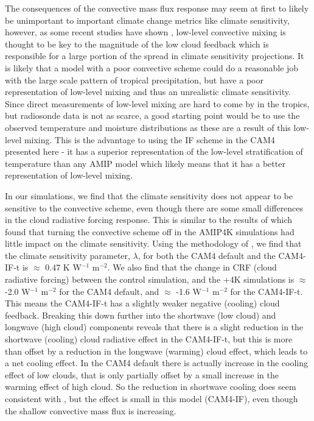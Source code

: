 \documentclass[letterpaper,12pt,titlepage,oneside,final]{book}
\begin{document}
The consequences of the convective mass flux response may seem at first to likely be unimportant to important climate change metrics like climate sensitivity, however, as some recent studies have shown \citep{sherwood_spread_2014,brient_shallowness_2016}, low-level convective mixing is thought to be key to the magnitude of the low cloud feedback which is responsible for a large portion of the spread in climate sensitivity projections. It is likely that a model with a poor convective scheme could do a reasonable job with the large scale pattern of tropical precipitation, but have a poor representation of low-level mixing and thus an unrealistic climate sensitivity. Since direct measurements of low-level mixing are hard to come by in the tropics, but radiosonde data is not as scarce, a good starting point would be to use the observed temperature and moisture distributions as these are a result of this low-level mixing. This is the advantage to using the IF scheme in the CAM4 presented here - it has a superior representation of the low-level stratification of temperature than any AMIP model which likely means that it has a better representation of low-level mixing.

In our simulations, we find that the climate sensitivity does not appear to be sensitive to the convective scheme, even though there are some small differences in the cloud radiative forcing response. This is similar to the results of \citep{webb_impact_2015} which found that turning the convective scheme off in the AMIP4K simulations had little impact on the climate sensitivity. Using the methodology of \citep{cess_intercomparison_1990}, we find that the climate sensitivity parameter, $\lambda$, for both the CAM4 default and the CAM4-IF-t is $\approx$ 0.47 K W$^{-1}$ m$^{-2}$. We also find that the change in CRF (cloud radiative forcing) between the control simulation, and the +4K simulations is $\approx$ -2.0 W$^{-1}$ m$^{-2}$ for the CAM4 default, and $\approx$ -1.6 W$^{-1}$ m$^{-2}$ for the CAM4-IF-t. This means the CAM4-IF-t has a slightly weaker negative (cooling) cloud feedback. Breaking this down further into the shortwave (low cloud) and longwave (high cloud) components reveals that there is a slight reduction in the shortwave (cooling) cloud radiative effect in the CAM4-IF-t, but this is more than offset by a reduction in the longwave (warming) cloud effect, which leads to a net cooling effect. In the CAM4 default there is actually increase in the cooling effect of low clouds, that is only partially offset by a small increase in the warming effect of high cloud. So the reduction in shortwave cooling does seem consistent with \citep{sherwood_spread_2014,brient_shallowness_2016}, but the effect is small in this model (CAM4-IF), even though the shallow convective mass flux is increasing.
\end{document}
